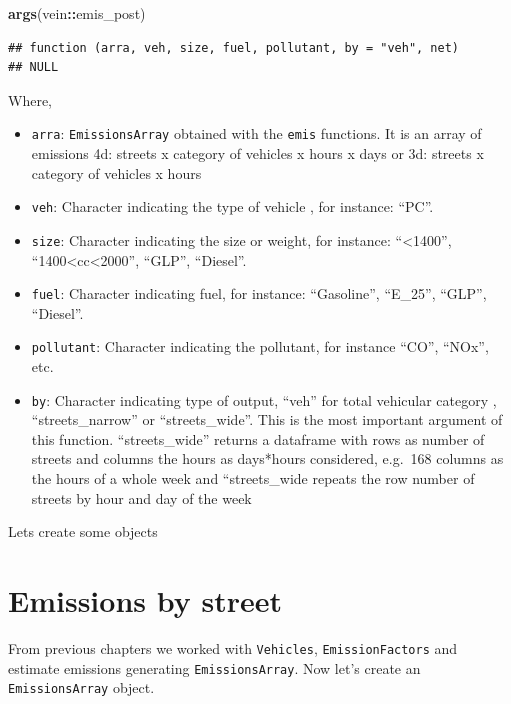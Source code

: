 \documentclass[12pt,graybox,envcountchap,sectrefs]{krantz}
\makeatletter
\newenvironment{Shaded}{\begin{snugshade}}{\end{snugshade}}
\newcommand{\KeywordTok}[1]{\textcolor[rgb]{0.13,0.29,0.53}{\textbf{#1}}}
\newcommand{\OperatorTok}[1]{\textcolor[rgb]{0.81,0.36,0.00}{\textbf{#1}}}
\newcommand{\NormalTok}[1]{#1}
\providecommand{\tightlist}{%
  \setlength{\itemsep}{0pt}\setlength{\parskip}{0pt}}
\newenvironment{kframe}{%
\medskip{}
\setlength{\fboxsep}{.8em}
 \def\at@end@of@kframe{}%
 \ifinner\ifhmode%
  \def\at@end@of@kframe{\end{minipage}}%
  \begin{minipage}{\columnwidth}%
 \fi\fi%
 \def\FrameCommand##1{\hskip\@totalleftmargin \hskip-\fboxsep
 \colorbox{shadecolor}{##1}\hskip-\fboxsep
     \hskip-\linewidth \hskip-\@totalleftmargin \hskip\columnwidth}%
 \MakeFramed {\advance\hsize-\width
   \@totalleftmargin\z@ \linewidth\hsize
   \@setminipage}}%
 {\par\unskip\endMakeFramed%
 \at@end@of@kframe}
\renewenvironment{Shaded}{\begin{kframe}}{\end{kframe}}
\theoremstyle{definition}
\theoremstyle{definition}
\theoremstyle{definition}
\theoremstyle{remark}
\makeatother
\begin{document}
\begin{Shaded}
\begin{Highlighting}[]
\KeywordTok{args}\NormalTok{(vein}\OperatorTok{::}\NormalTok{emis_post)}
\end{Highlighting}
\end{Shaded}

\begin{verbatim}
## function (arra, veh, size, fuel, pollutant, by = "veh", net) 
## NULL
\end{verbatim}

Where,

\begin{itemize}
\tightlist
\item
  \texttt{arra}: \texttt{EmissionsArray} obtained with the \texttt{emis}
  functions. It is an array of emissions 4d: streets x category of
  vehicles x hours x days or 3d: streets x category of vehicles x hours
\item
  \texttt{veh}: Character indicating the type of vehicle , for instance:
  ``PC''.
\item
  \texttt{size}: Character indicating the size or weight, for instance:
  ``\textless{}1400'', ``1400\textless{}cc\textless{}2000'', ``GLP'',
  ``Diesel''.
\item
  \texttt{fuel}: Character indicating fuel, for instance: ``Gasoline'',
  ``E\_25'', ``GLP'', ``Diesel''.
\item
  \texttt{pollutant}: Character indicating the pollutant, for instance
  ``CO'', ``NOx'', etc.
\item
  \texttt{by}: Character indicating type of output, ``veh'' for total
  vehicular category , ``streets\_narrow'' or ``streets\_wide''. This is
  the most important argument of this function. ``streets\_wide''
  returns a dataframe with rows as number of streets and columns the
  hours as days*hours considered, e.g.~168 columns as the hours of a
  whole week and ``streets\_wide repeats the row number of streets by
  hour and day of the week
\end{itemize}

Lets create some objects

\section{Emissions by street}\label{emissions-by-street}

From previous chapters we worked with \texttt{Vehicles},
\texttt{EmissionFactors} and estimate emissions generating
\texttt{EmissionsArray}. Now let's create an \texttt{EmissionsArray}
object.
\end{document}
